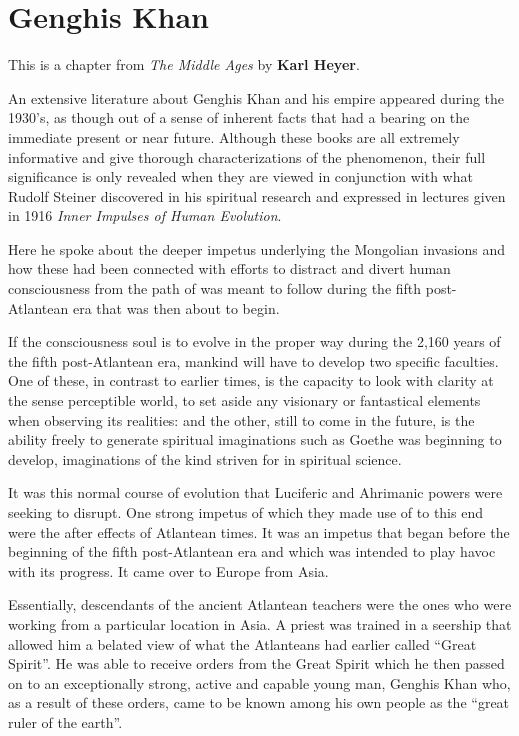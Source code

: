 \section{Genghis Khan}

\begin{quotex}
This is a chapter from \textit{The Middle Ages} by \textbf{Karl Heyer}.
\end{quotex}

An extensive literature about Genghis Khan and his empire appeared during the 1930's, as though out of a sense of inherent facts that had a bearing on the immediate present or near future. Although these books are all extremely informative and give thorough characterizations of the phenomenon, their full significance is only revealed when they are viewed in conjunction with what Rudolf Steiner discovered in his spiritual research and expressed in lectures given in 1916 \emph{Inner Impulses of Human Evolution}.

Here he spoke about the deeper impetus underlying the Mongolian invasions and how these had been connected with efforts to distract and divert human consciousness from the path of was meant to follow during the fifth post-Atlantean era that was then about to begin.

If the consciousness soul is to evolve in the proper way during the 2,160 years of the fifth post-Atlantean era, mankind will have to develop two specific faculties. One of these, in contrast to earlier times, is the capacity to look with clarity at the sense perceptible world, to set aside any visionary or fantastical elements when observing its realities: and the other, still to come in the future, is the ability freely to generate spiritual imaginations such as Goethe was beginning to develop, imaginations of the kind striven for in spiritual science.

It was this normal course of evolution that Luciferic and Ahrimanic powers were seeking to disrupt. One strong impetus of which they made use of to this end were the after effects of Atlantean times. It was an impetus that began before the beginning of the fifth post-Atlantean era and which was intended to play havoc with its progress. It came over to Europe from Asia.

Essentially, descendants of the ancient Atlantean teachers were the ones who were working from a particular location in Asia. A priest was trained in a seership that allowed him a belated view of what the Atlanteans had earlier called ``Great Spirit''. He was able to receive orders from the Great Spirit which he then passed on to an exceptionally strong, active and capable young man, Genghis Khan who, as a result of these orders, came to be known among his own people as the ``great ruler of the earth''.


